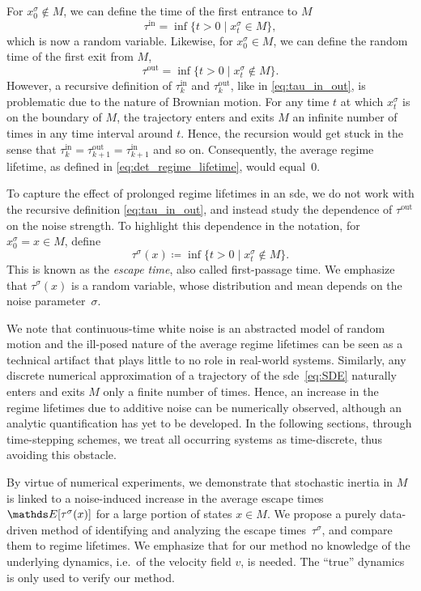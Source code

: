 For $x_0^\sigma \notin M$, we can define the time of the first entrance to $M$
\begin{equation}
    \tau^\text{in} = \inf \{t>0 \mid x_t^\sigma \in M\},
\end{equation}
which is now a random variable.
Likewise, for $x_0^\sigma \in M$, we can define the random time of the first exit from $M$,
\begin{equation}
    \tau^\text{out} = \inf\{t>0 \mid x_t^\sigma \notin M\}.
\end{equation}
However, a recursive definition of $\tau_k^\text{in}$ and $\tau_k^\text{out}$, like in \cref{eq:tau_in_out}, is problematic due to the nature of Brownian motion. For any time $t$ at which $x_{t}^\sigma$ is on the boundary of $M$, the trajectory enters and exits $M$ an infinite number of times in any time interval around $t$. Hence, the recursion would get stuck in the sense that $\tau_k^\text{in} = \tau_{k+1}^\text{out} = \tau_{k+1}^\text{in}$ and so on. Consequently, the average regime lifetime, as defined in \cref{eq:det_regime_lifetime}, would equal~$0$.

To capture the effect of prolonged regime lifetimes in an \gls{sde}, we do not work with the recursive definition \ref{eq:tau_in_out}, and instead study the dependence of $\tau^\text{out}$ on the noise strength. To highlight this dependence in the notation, for $x_0^\sigma = x \in M$, define
\begin{equation}\label{eq:def_tau}
    \tau^\sigma(x) \coloneqq \inf\{t>0 \mid x_t^\sigma \notin M\}.
\end{equation}
This is known as the \emph{escape time}, also called first-passage time. We emphasize that $\tau^\sigma(x)$ is a random variable, whose distribution and mean depends on the noise parameter~$\sigma$.

We note that continuous-time white noise is an abstracted model of random motion and the ill-posed nature of the average regime lifetimes can be seen as a technical artifact that plays little to no role in real-world systems. Similarly, any discrete numerical approximation of a trajectory of the \gls{sde}~\eqref{eq:SDE} naturally  enters and exits $M$ only a finite number of times. Hence, an increase in the regime lifetimes due to additive noise can be numerically observed, although an analytic quantification has yet to be developed. In the following sections, through time-stepping schemes, we treat all occurring systems as time-discrete, thus avoiding this obstacle.

By virtue of numerical experiments, we demonstrate that stochastic inertia in $M$ is linked to a noise-induced increase in the average escape times~$\E[\tau^\sigma(x)]$ for a large portion of states $x\in M$. We propose a purely data-driven method of identifying and analyzing the escape times~$\tau^\sigma$, and compare them to regime lifetimes. We emphasize that for our method no knowledge of the underlying dynamics, i.e.~of the velocity field $v$, is needed. The \enquote{true} dynamics is only used to verify our method.

